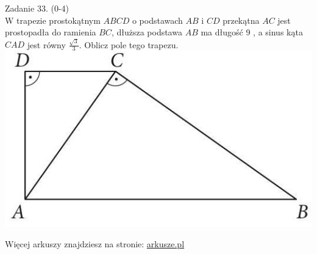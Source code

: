 \documentclass[10pt]{article}
\begin{document}
Zadanie 33. (0-4)\\
W trapezie prostokątnym \(A B C D\) o podstawach \(A B\) i \(C D\) przekątna \(A C\) jest prostopadła do ramienia \(B C\), dłuższa podstawa \(A B\) ma długość 9 , a sinus kąta \(C A D\) jest równy \(\frac{\sqrt{3}}{3}\). Oblicz pole tego trapezu.\\
\includegraphics[max width=\textwidth, center]{2024_11_21_1e89351873aa60c4c1b9g-18(1)}

Więcej arkuszy znajdziesz na stronie: \href{http://arkusze.pl}{arkusze.pl}
\end{document}
